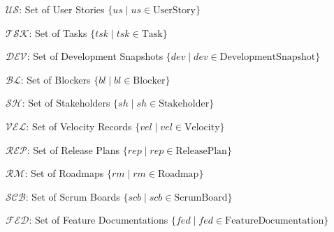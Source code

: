 \documentclass[12pt]{article}
\begin{document}
    \item $ \mathcal{US} $: Set of User Stories $ \{ us \mid us \in \text{UserStory} \} $
    \item $ \mathcal{TSK} $: Set of Tasks $ \{ tsk \mid tsk \in \text{Task} \} $
    \item $ \mathcal{DEV} $: Set of Development Snapshots $ \{ dev \mid dev \in \text{DevelopmentSnapshot} \} $
    \item $ \mathcal{BL} $: Set of Blockers $ \{ bl \mid bl \in \text{Blocker} \} $
    \item $ \mathcal{SH} $: Set of Stakeholders $ \{ sh \mid sh \in \text{Stakeholder} \} $
    \item $ \mathcal{VEL} $: Set of Velocity Records $ \{ vel \mid vel \in \text{Velocity} \} $
    \item $ \mathcal{REP} $: Set of Release Plans $ \{ rep \mid rep \in \text{ReleasePlan} \} $
    \item $ \mathcal{RM} $: Set of Roadmaps $ \{ rm \mid rm \in \text{Roadmap} \} $
    \item $ \mathcal{SCB} $: Set of Scrum Boards $ \{ scb \mid scb \in \text{ScrumBoard} \} $
    \item $ \mathcal{FED} $: Set of Feature Documentations $ \{ fed \mid fed \in \text{FeatureDocumentation} \} $
\end{document}
